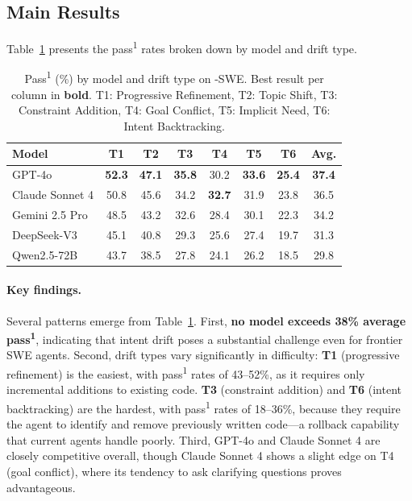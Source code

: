 \subsection{Main Results}
\label{sec:main-results}

Table~\ref{tab:main-results} presents the pass\textsuperscript{1} rates broken down by model and drift type.

\begin{table}[t]
\centering
\caption{Pass\textsuperscript{1} (\%) by model and drift type on \bench{}-SWE. Best result per column in \textbf{bold}. T1: Progressive Refinement, T2: Topic Shift, T3: Constraint Addition, T4: Goal Conflict, T5: Implicit Need, T6: Intent Backtracking.}
\label{tab:main-results}
\small
\begin{tabular}{l cccccc c}
\toprule
\textbf{Model} & \textbf{T1} & \textbf{T2} & \textbf{T3} & \textbf{T4} & \textbf{T5} & \textbf{T6} & \textbf{Avg.} \\
\midrule
GPT-4o          & \textbf{52.3} & \textbf{47.1} & \textbf{35.8} & 30.2 & \textbf{33.6} & \textbf{25.4} & \textbf{37.4} \\
Claude Sonnet 4 & 50.8 & 45.6 & 34.2 & \textbf{32.7} & 31.9 & 23.8 & 36.5 \\
Gemini 2.5 Pro  & 48.5 & 43.2 & 32.6 & 28.4 & 30.1 & 22.3 & 34.2 \\
DeepSeek-V3     & 45.1 & 40.8 & 29.3 & 25.6 & 27.4 & 19.7 & 31.3 \\
Qwen2.5-72B     & 43.7 & 38.5 & 27.8 & 24.1 & 26.2 & 18.5 & 29.8 \\
\bottomrule
\end{tabular}
\end{table}

\paragraph{Key findings.}
Several patterns emerge from Table~\ref{tab:main-results}. First, \textbf{no model exceeds 38\% average pass\textsuperscript{1}}, indicating that intent drift poses a substantial challenge even for frontier SWE agents. Second, drift types vary significantly in difficulty: \textbf{T1} (progressive refinement) is the easiest, with pass\textsuperscript{1} rates of 43--52\%, as it requires only incremental additions to existing code. \textbf{T3} (constraint addition) and \textbf{T6} (intent backtracking) are the hardest, with pass\textsuperscript{1} rates of 18--36\%, because they require the agent to identify and remove previously written code---a rollback capability that current agents handle poorly. Third, GPT-4o and Claude Sonnet 4 are closely competitive overall, though Claude Sonnet 4 shows a slight edge on T4 (goal conflict), where its tendency to ask clarifying questions proves advantageous.

